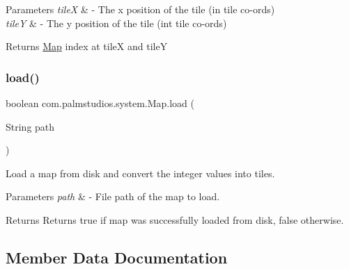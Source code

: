 \begin{DoxyParams}{Parameters}
{\em tileX} & -\/ The x position of the tile (in tile co-\/ords) \\
\hline
{\em tileY} & -\/ The y position of the tile (int tile co-\/ords) \\
\hline
\end{DoxyParams}
\begin{DoxyReturn}{Returns}
\hyperlink{classcom_1_1palmstudios_1_1system_1_1_map}{Map} index at tileX and tileY 
\end{DoxyReturn}
\mbox{\label{classcom_1_1palmstudios_1_1system_1_1_map_a8ce10a04520ed4c9c61e9548226155d2}} 
\subsubsection{\texorpdfstring{load()}{load()}}
{\footnotesize\ttfamily boolean com.\+palmstudios.\+system.\+Map.\+load (\begin{DoxyParamCaption}\item[{String}]{path }\end{DoxyParamCaption})}

Load a map from disk and convert the integer values into tiles.


\begin{DoxyParams}{Parameters}
{\em path} & -\/ File path of the map to load. \\
\hline
\end{DoxyParams}
\begin{DoxyReturn}{Returns}
Returns true if map was successfully loaded from disk, false otherwise. 
\end{DoxyReturn}


\subsection{Member Data Documentation}
\mbox{\label{classcom_1_1palmstudios_1_1system_1_1_map_a562dc563813042f35ae93f7b8709b6a3}} 
